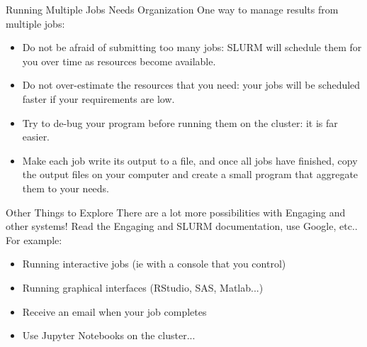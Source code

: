 \documentclass{beamer}
\begin{document}
\begin{frame}{Running Multiple Jobs Needs Organization}
  One way to manage results from multiple jobs:
  \begin{itemize}
    \item Do not be afraid of submitting too many jobs: SLURM will schedule them for you over time as resources become available.
    \item Do not over-estimate the resources that you need: your jobs will be scheduled faster if your requirements are low.
    \item Try to de-bug your program before running them on the cluster: it is far easier.
    \item Make each job write its output to a file, and once all jobs have finished, copy the output files on your computer and create a small program that aggregate them to your needs.
  \end{itemize}
\end{frame}

\begin{frame}{Other Things to Explore}
  There are a lot more possibilities with Engaging and other systems! Read the Engaging and SLURM documentation, use Google, etc.. For example:
  \begin{itemize}
    \item Running interactive jobs (ie with a console that you control)
    \item Running graphical interfaces (RStudio, SAS, Matlab...)
    \item Receive an email when your job completes
    \item Use Jupyter Notebooks on the cluster...
  \end{itemize}
\end{frame}
\end{document}
